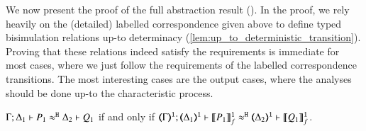 

\noindent We now present the proof of the full abstraction result ().
In the proof, we rely heavily on the (detailed) labelled correspondence given above to define 
typed bisimulation relations up-to determinacy (\ref{lem:up_to_deterministic_transition}). 
Proving that these relations indeed satisfy the requirements is immediate for most cases, where we just follow the requirements of the labelled correspondence transitions.
The most interesting cases are the output cases, where the analyses should be done up-to the characteristic process.


\begin{proposition}\rm
	\label{app:prop:fulla_HOp_to_HO}
	$\Gamma; \Delta_1 \vdash P_1 \approx^\mathtt{H} \Delta_2 \vdash Q_1$
	if and only if
	$\horel{\tmap{\Gamma}{1}}{\tmap{\Delta_1}{1}}{\pmapp{P_1}{1}{f}}{\hwb}{\tmap{\Delta_2}{1}}{\pmapp{Q_1}{1}{f}}$.
\end{proposition}


